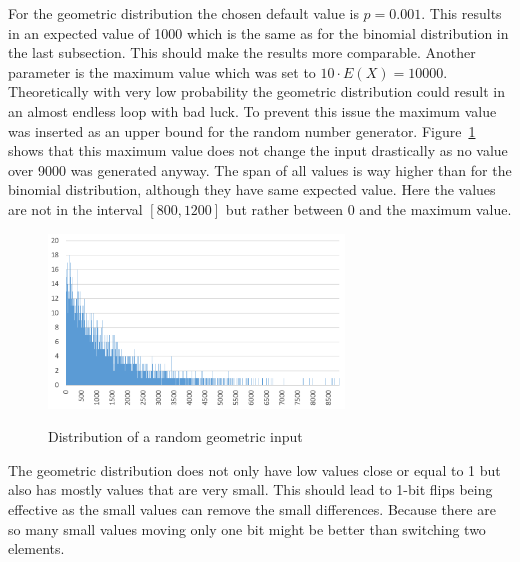 For the geometric distribution the chosen default value is $p=0.001$.
This results in an expected value of 1000 which is the same as for the binomial distribution in the last subsection.
This should make the results more comparable.
Another parameter is the maximum value which was set to $10 \cdot E(X)=10000$.
Theoretically with very low probability the geometric distribution could result in an almost endless loop with bad luck.
To prevent this issue the maximum value was inserted as an upper bound for the random number generator. 
Figure~\ref{fig:geoDistExample} shows that this maximum value does not change the input drastically as no value over 9000 was generated anyway.
The span of all values is way higher than for the binomial distribution, although they have same expected value.
Here the values are not in the interval $[800,1200]$ but rather between 0 and the maximum value. 

\begin{figure}[h]
      \caption{Distribution of a random geometric input}
      \centering
      \includegraphics[width=0.7\textwidth]{figures/images/numberGenerator/geometricDistributionForp0_001.png}\label{fig:geoDistExample}
\end{figure}

The geometric distribution does not only have low values close or equal to 1 but also has mostly values that are very small.
This should lead to 1-bit flips being effective as the small values can remove the small differences. Because there are so many small values moving only one bit might be better than switching two elements.  